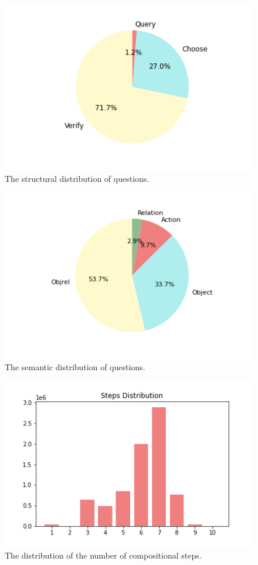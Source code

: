 \documentclass[10pt,twocolumn,letterpaper]{article}
\begin{document}
\begin{figure}[t]
\begin{center}
\includegraphics[width=0.8\linewidth]{Figures/struct_dist.png}
\caption{The structural distribution of questions.}
\end{center}
\label{structural}
\end{figure}


\begin{figure}[t]
\begin{center}
\includegraphics[width=0.8\linewidth]{Figures/sem_dist.png}
\end{center}
   \caption{The semantic distribution of questions.}
\label{semantics}
\end{figure}


\begin{figure}[t]
\begin{center}
\includegraphics[width=0.8\linewidth]{Figures/steps_dist.png}
\end{center}
   \caption{The distribution of the number of compositional steps.}
\label{steps}
\end{figure}
\end{document}
